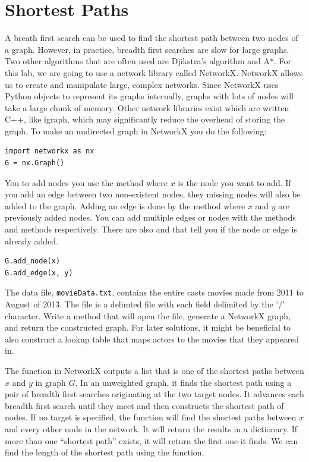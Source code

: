 \section*{Shortest Paths}
A breath first search can be used to find the shortest path between two nodes of a graph.  However, in practice, breadth first searches are slow for large graphs. Two other algorithms that are often used are Djikstra's algorithm and A*. For this lab, we are going to use a network library called NetworkX. NetworkX allows us to create and manipulate large, complex networks.  Since NetworkX uses Python objects to represent its graphs internally, graphs with lots of nodes will take a large chunk of memory.  Other network libraries exist which are written C++, like igraph, which may significantly reduce the overhead of storing the graph.
To make an undirected graph in NetworkX you do the following:
\begin{lstlisting}
import networkx as nx
G = nx.Graph()
\end{lstlisting}
You to add nodes you use the  method where $x$ is the node you want to add.  If you add an edge between two non-existent nodes, they missing nodes will also be added to the graph. Adding an edge is done by the  method where $x$ and $y$ are previously added nodes. You can add multiple edges or nodes with the methods  and  methods respectively.  There are also  and  that tell you if the node or edge is already added.
\begin{lstlisting}
G.add_node(x)
G.add_edge(x, y)
\end{lstlisting}

\begin{problem}
The data file, \texttt{movieData.txt}, contains the entire casts movies made from 2011 to August of 2013. The file is a delimted file with each field delimited by the '/' character.
Write a method that will open the file, generate a NetworkX graph, and return the constructed graph.
For later solutions, it might be beneficial to also construct a lookup table that maps actors to the movies that they appeared in.
\end{problem}

The  function in NetworkX outputs a list that is one of the shortest paths between $x$ and $y$ in graph $G$.  In an unweighted graph, it finds the shortest path using a pair of breadth first searches originating at the two target nodes.  It advances each breadth first search until they meet and then  constructs the shortest path of nodes.  If no target is specified, the function will find the shortest paths between $x$ and every other node in the network.  It will return the results in a dictionary.  If more than one ``shortest path'' exists, it will return the first one it finds.  We can find the length of the shortest path using the  function.

